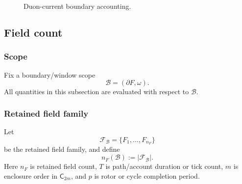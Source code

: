 \begin{figure}[H]
\centering
{}
\caption{Duon-current boundary accounting.}
\label{fig:v39-duon-current-boundary-accounting}
\end{figure}


\subsection{Field count}\label{sec:field-count-sadar-scope}

\subsubsection{Scope}\label{subsec:field-count-fixed-scope}
Fix a boundary/window scope
\[
\mathcal B=(\partial F,\omega).
\]
All quantities in this subsection are evaluated with respect to \(\mathcal B\).

\subsubsection{Retained field family}\label{subsec:retained-field-family}
Let
\[
\mathcal F_{\mathcal B}=\{F_1,\ldots,F_{n_F}\}
\]
be the retained field family, and define
\begin{equation}
n_F(\mathcal B):=|\mathcal F_{\mathcal B}|.
\label{eq:field-count}
\end{equation}
Here \(n_F\) is retained field count, \(T\) is path/account duration or tick count, \(m\) is enclosure order in \(\mathsf C_{2m}\), and \(p\) is rotor or cycle completion period.

